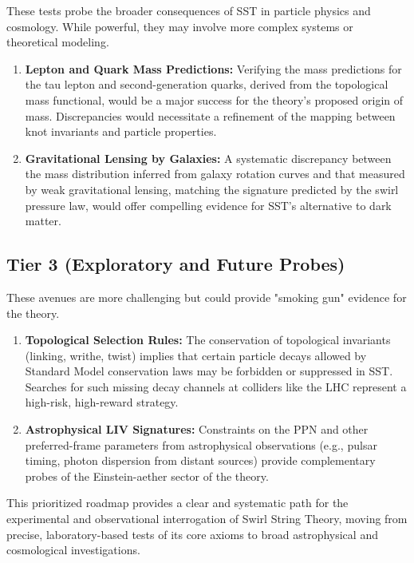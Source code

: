 \documentclass[11pt, a4paper]{article}
\begin{document}
        These tests probe the broader consequences of SST in particle physics and cosmology. While powerful, they may involve more complex systems or theoretical modeling.
        \begin{enumerate}
        \item \textbf{Lepton and Quark Mass Predictions:} Verifying the mass predictions for the tau lepton and second-generation quarks, derived from the topological mass functional, would be a major success for the theory's proposed origin of mass. Discrepancies would necessitate a refinement of the mapping between knot invariants and particle properties.
        \item \textbf{Gravitational Lensing by Galaxies:} A systematic discrepancy between the mass distribution inferred from galaxy rotation curves and that measured by weak gravitational lensing, matching the signature predicted by the swirl pressure law, would offer compelling evidence for SST's alternative to dark matter.
        \end{enumerate}

    \subsection{Tier 3 (Exploratory and Future Probes)}

        These avenues are more challenging but could provide "smoking gun" evidence for the theory.
        \begin{enumerate}
        \item \textbf{Topological Selection Rules:} The conservation of topological invariants (linking, writhe, twist) implies that certain particle decays allowed by Standard Model conservation laws may be forbidden or suppressed in SST. Searches for such missing decay channels at colliders like the LHC represent a high-risk, high-reward strategy.
        \item \textbf{Astrophysical LIV Signatures:} Constraints on the PPN and other preferred-frame parameters from astrophysical observations (e.g., pulsar timing, photon dispersion from distant sources) provide complementary probes of the Einstein-aether sector of the theory.
        \end{enumerate}
        This prioritized roadmap provides a clear and systematic path for the experimental and observational interrogation of Swirl String Theory, moving from precise, laboratory-based tests of its core axioms to broad astrophysical and cosmological investigations.
\end{document}
